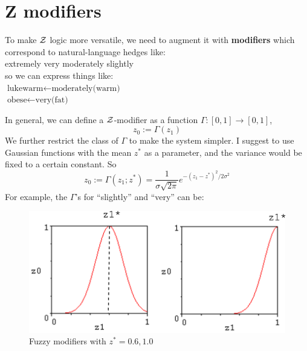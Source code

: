 \section{Z modifiers}
\label{sec:Z-modifiers}

To make $\mathcal{Z}$ logic more versatile, we need to augment it with \textbf{modifiers} which correspond to natural-language hedges like:\\
\hspace*{1cm} extremely \hspace*{1cm} very \hspace*{1cm} moderately \hspace*{1cm} slightly\\
so we can express things like:\\
\hspace*{1cm} $\mbox{lukewarm} \leftarrow \mbox{moderately(warm)}$\\
\hspace*{1cm} $\mbox{obese} \leftarrow \mbox{very(fat)}$

In general, we can define a $\mathcal{Z}$-modifier as a function $\Gamma: [0,1] \rightarrow [0,1]$,
\begin{equation}
z_0 := \Gamma(z_1)
\end{equation}
We further restrict the class of $\Gamma$ to make the system simpler.  I suggest to use Gaussian functions with the mean $z^*$ as a parameter, and the variance would be fixed to a certain constant.  So
\begin{equation}
z_0 := \Gamma(z_1; z^*) = \frac{1}{\sigma \sqrt{2 \pi}} e^{- (z_1-z^*)^2 / 2 \sigma^2}
\label{eqn:fuzzy-moderator-Gaussian}
\end{equation}
For example, the $\Gamma$'s for ``slightly'' and ``very'' can be:
\begin{figure}[H]
\centering
\includegraphics[scale=0.9]{fuzzy-modifiers.png}
\caption{Fuzzy modifiers with $z^* = 0.6, 1.0$}
\end{figure}

